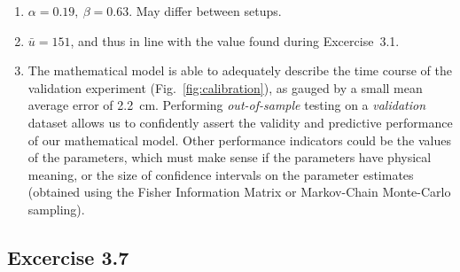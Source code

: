 \documentclass[10pt,twoside,openright]{article}
\begin{document}
\begin{enumerate}
\setlength\itemsep{0em}
\item $\alpha=0.19,~\beta=0.63$. May differ between setups.
\item $\bar{u} = 151$, and thus in line with the value found during Excercise~3.1.
\item The mathematical model is able to adequately describe the time course of the validation experiment (Fig.~\ref{fig:calibration}), as gauged by a small mean average error of 2.2~cm. Performing \textit{out-of-sample} testing on a \textit{validation} dataset allows us to confidently assert the validity and predictive performance of our mathematical model. Other performance indicators could be the values of the parameters, which must make sense if the parameters have physical meaning, or the size of confidence intervals on the parameter estimates (obtained using the Fisher Information Matrix or Markov-Chain Monte-Carlo sampling).
\end{enumerate}

\subsection*{Excercise 3.7}
\end{document}
